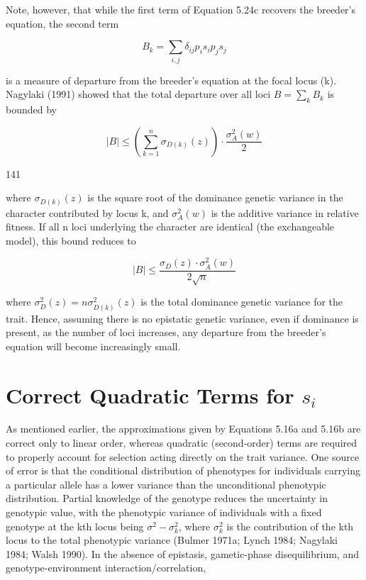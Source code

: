 \documentclass{article}
\begin{document}
Note, however, that while the first term of Equation 5.24c recovers the breeder’s equation, the second term

\begin{equation}
B_{k}=\sum_{i,j}\delta_{ij}p_{i}s_{i}p_{j}s_{j}
\end{equation}

is a measure of departure from the breeder’s equation at the focal locus (k). Nagylaki (1991) showed that the total departure over all loci  $ B = \sum_k B_k $ is bounded by

\begin{equation}
\left|B\right|\leq\left(\sum_{k=1}^{n}\sigma_{D(k)}(z)\right)\cdot\frac{\sigma_{A}^{2}(w)}{2}
\end{equation}

141

where  $ \sigma_{D(k)}(z) $ is the square root of the dominance genetic variance in the character contributed by locus k, and  $ \sigma_{A}^{2}(w) $ is the additive variance in relative fitness. If all n loci underlying the character are identical (the exchangeable model), this bound reduces to

\begin{equation}
\left|B\right|\leq\frac{\sigma_{D}(z)\cdot\sigma_{A}^{2}(w)}{2\sqrt{n}}
\end{equation}

where  $ \sigma_{D}^{2}(z) = n\sigma_{D(k)}^{2}(z) $ is the total dominance genetic variance for the trait. Hence, assuming there is no epistatic genetic variance, even if dominance is present, as the number of loci increases, any departure from the breeder's equation will become increasingly small.

\section{Correct Quadratic Terms for  $ s_{i} $}
As mentioned earlier, the approximations given by Equations 5.16a and 5.16b are correct only to linear order, whereas quadratic (second-order) terms are required to properly account for selection acting directly on the trait variance. One source of error is that the conditional distribution of phenotypes for individuals carrying a particular allele has a lower variance than the unconditional phenotypic distribution. Partial knowledge of the genotype reduces the uncertainty in genotypic value, with the phenotypic variance of individuals with a fixed genotype at the kth locus being  $ \sigma^2 - \sigma_k^2 $, where  $ \sigma_k^2 $ is the contribution of the kth locus to the total phenotypic variance (Bulmer 1971a; Lynch 1984; Nagylaki 1984; Walsh 1990). In the absence of epistasis, gametic-phase disequilibrium, and genotype-environment interaction/correlation,
\end{document}
